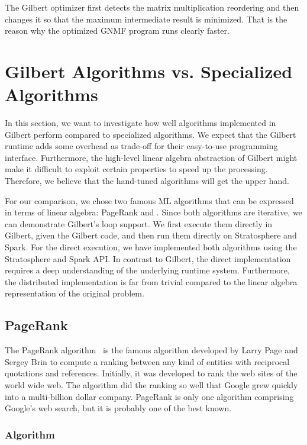 The Gilbert optimizer first detects the matrix multiplication reordering and then changes it so that the maximum intermediate result is minimized.
That is the reason why the optimized GNMF program runs clearly faster.

\section{Gilbert Algorithms vs. Specialized Algorithms}

In this section, we want to investigate how well algorithms implemented in Gilbert perform compared to specialized algorithms.
We expect that the Gilbert runtime adds some overhead as trade-off for their easy-to-use programming interface.
Furthermore, the high-level linear algebra abstraction of Gilbert might make it difficult to exploit certain properties to speed up the processing.
Therefore, we believe that the hand-tuned algorithms will get the upper hand.

For our comparison, we chose two famous ML algorithms that can be expressed in terms of linear algebra: PageRank and \kmeans.
Since both algorithms are iterative, we can demonstrate Gilbert's loop support.
We first execute them directly in Gilbert, given the Gilbert code, and then run them directly on Stratosphere and Spark.
For the direct execution, we have implemented both algorithms using the Stratosphere and Spark API.
In contrast to Gilbert, the direct implementation requires a deep understanding of the underlying runtime system.
Furthermore, the distributed implementation is far from trivial compared to the linear algebra representation of the original problem.

\subsection{PageRank}

The PageRank algorithm~\cite{page:1999a} is the famous algorithm developed by Larry Page and Sergey Brin to compute a ranking between any kind of entities with reciprocal quotations and references.
Initially, it was developed to rank the web sites of the world wide web.
The algorithm did the ranking so well that Google grew quickly into a multi-billion dollar company.
PageRank is only one algorithm comprising Google's web search, but it is probably one of the best known.

\subsubsection{Algorithm}

